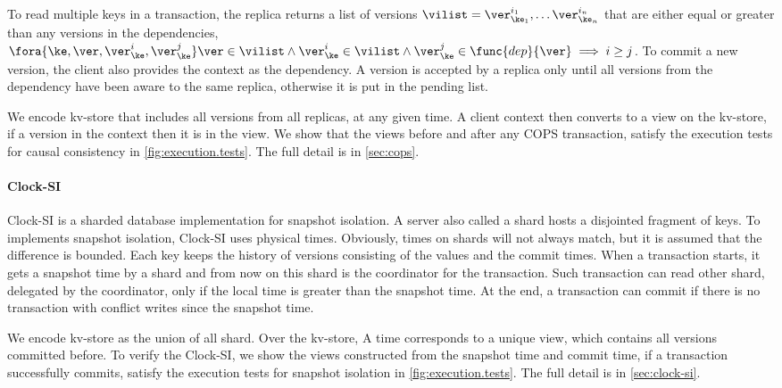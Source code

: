 To read multiple keys in a transaction, the replica returns a list of versions \( \vilist = \ver^{i_1}_{\ke_1}, \dots \ver^{i_n}_{\ke_n} \) 
that are either equal or greater than any versions in the dependencies,
\ie \( \fora{\ke, \ver, \ver^{i}_{\ke}, \ver^{j}_{\ke}} \ver \in \vilist \land \ver^{i}_{\ke} \in \vilist \land \ver^{j}_{\ke} \in \func{dep}{\ver} \implies i \geq j \).
To commit a new version, the client also provides the context as the dependency.
A version is accepted by a replica
only until all versions from the dependency have been aware to the same replica,
otherwise it is put in the pending list.

We encode kv-store that includes all versions from all replicas, at any given time.
A client context then converts to a view on the kv-store, 
\ie if a version in the context then it is in the view.
We show that the views before and after any COPS transaction,
satisfy the execution tests for causal consistency in \cref{fig:execution.tests}.
The full detail is in \cref{sec:cops}.

\paragraph{\bf Clock-SI}
Clock-SI is a sharded database implementation for snapshot isolation.
A server also called a shard hosts a disjointed fragment of keys.
To implements snapshot isolation, Clock-SI uses physical times.
Obviously, times on shards will not always match, but it is assumed that the difference is bounded.
Each key keeps the history of versions consisting of the values and the commit times.
When a transaction starts, it gets a snapshot time by a shard 
and from now on this shard is the coordinator for the transaction.
Such transaction can read other shard, delegated by the coordinator, only if the local time is greater than the snapshot time.
At the end, a transaction can commit if there is no transaction with conflict writes since the snapshot time.

We encode kv-store as the union of all shard.
Over the kv-store, 
A time corresponds to a unique view,
which contains all versions committed before.
To verify the Clock-SI, 
we show the views constructed from the snapshot time and commit time,
if a transaction successfully commits, 
satisfy the execution tests for snapshot isolation in \cref{fig:execution.tests}.
The full detail is in \cref{sec:clock-si}.
